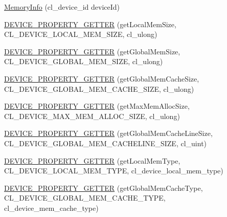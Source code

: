 \begin{DoxyCompactItemize}
\item 
\hyperlink{class_c_l_ray_tracer_1_1_open_c_l_utils_1_1_c_l_device_1_1_memory_info_a1f9e9a78cff368d8b48347091aa2ce74}{Memory\+Info} (cl\+\_\+device\+\_\+id device\+Id)
\item 
\hyperlink{class_c_l_ray_tracer_1_1_open_c_l_utils_1_1_c_l_device_1_1_memory_info_a3c3f29d75482d433ca18f48fb3e32236}{D\+E\+V\+I\+C\+E\+\_\+\+P\+R\+O\+P\+E\+R\+T\+Y\+\_\+\+G\+E\+T\+T\+ER} (get\+Local\+Mem\+Size, C\+L\+\_\+\+D\+E\+V\+I\+C\+E\+\_\+\+L\+O\+C\+A\+L\+\_\+\+M\+E\+M\+\_\+\+S\+I\+ZE, cl\+\_\+ulong)
\item 
\hyperlink{class_c_l_ray_tracer_1_1_open_c_l_utils_1_1_c_l_device_1_1_memory_info_ab8ff0ceffee5579cdda8c03c857de47b}{D\+E\+V\+I\+C\+E\+\_\+\+P\+R\+O\+P\+E\+R\+T\+Y\+\_\+\+G\+E\+T\+T\+ER} (get\+Global\+Mem\+Size, C\+L\+\_\+\+D\+E\+V\+I\+C\+E\+\_\+\+G\+L\+O\+B\+A\+L\+\_\+\+M\+E\+M\+\_\+\+S\+I\+ZE, cl\+\_\+ulong)
\item 
\hyperlink{class_c_l_ray_tracer_1_1_open_c_l_utils_1_1_c_l_device_1_1_memory_info_aeccafbace780f9bc1ec1dc372712110f}{D\+E\+V\+I\+C\+E\+\_\+\+P\+R\+O\+P\+E\+R\+T\+Y\+\_\+\+G\+E\+T\+T\+ER} (get\+Global\+Mem\+Cache\+Size, C\+L\+\_\+\+D\+E\+V\+I\+C\+E\+\_\+\+G\+L\+O\+B\+A\+L\+\_\+\+M\+E\+M\+\_\+\+C\+A\+C\+H\+E\+\_\+\+S\+I\+ZE, cl\+\_\+ulong)
\item 
\hyperlink{class_c_l_ray_tracer_1_1_open_c_l_utils_1_1_c_l_device_1_1_memory_info_a02a687ef4b08a7377185609141c21b4e}{D\+E\+V\+I\+C\+E\+\_\+\+P\+R\+O\+P\+E\+R\+T\+Y\+\_\+\+G\+E\+T\+T\+ER} (get\+Max\+Mem\+Alloc\+Size, C\+L\+\_\+\+D\+E\+V\+I\+C\+E\+\_\+\+M\+A\+X\+\_\+\+M\+E\+M\+\_\+\+A\+L\+L\+O\+C\+\_\+\+S\+I\+ZE, cl\+\_\+ulong)
\item 
\hyperlink{class_c_l_ray_tracer_1_1_open_c_l_utils_1_1_c_l_device_1_1_memory_info_a81f3d65edcee9245f6d0e08dacffc6cd}{D\+E\+V\+I\+C\+E\+\_\+\+P\+R\+O\+P\+E\+R\+T\+Y\+\_\+\+G\+E\+T\+T\+ER} (get\+Global\+Mem\+Cache\+Line\+Size, C\+L\+\_\+\+D\+E\+V\+I\+C\+E\+\_\+\+G\+L\+O\+B\+A\+L\+\_\+\+M\+E\+M\+\_\+\+C\+A\+C\+H\+E\+L\+I\+N\+E\+\_\+\+S\+I\+ZE, cl\+\_\+uint)
\item 
\hyperlink{class_c_l_ray_tracer_1_1_open_c_l_utils_1_1_c_l_device_1_1_memory_info_ac2739749bd79c9a42c69cb84b29b7114}{D\+E\+V\+I\+C\+E\+\_\+\+P\+R\+O\+P\+E\+R\+T\+Y\+\_\+\+G\+E\+T\+T\+ER} (get\+Local\+Mem\+Type, C\+L\+\_\+\+D\+E\+V\+I\+C\+E\+\_\+\+L\+O\+C\+A\+L\+\_\+\+M\+E\+M\+\_\+\+T\+Y\+PE, cl\+\_\+device\+\_\+local\+\_\+mem\+\_\+type)
\item 
\hyperlink{class_c_l_ray_tracer_1_1_open_c_l_utils_1_1_c_l_device_1_1_memory_info_a0c3978d29b3ef632792a19ead7a9c05e}{D\+E\+V\+I\+C\+E\+\_\+\+P\+R\+O\+P\+E\+R\+T\+Y\+\_\+\+G\+E\+T\+T\+ER} (get\+Global\+Mem\+Cache\+Type, C\+L\+\_\+\+D\+E\+V\+I\+C\+E\+\_\+\+G\+L\+O\+B\+A\+L\+\_\+\+M\+E\+M\+\_\+\+C\+A\+C\+H\+E\+\_\+\+T\+Y\+PE, cl\+\_\+device\+\_\+mem\+\_\+cache\+\_\+type)

\end{DoxyCompactItemize}
